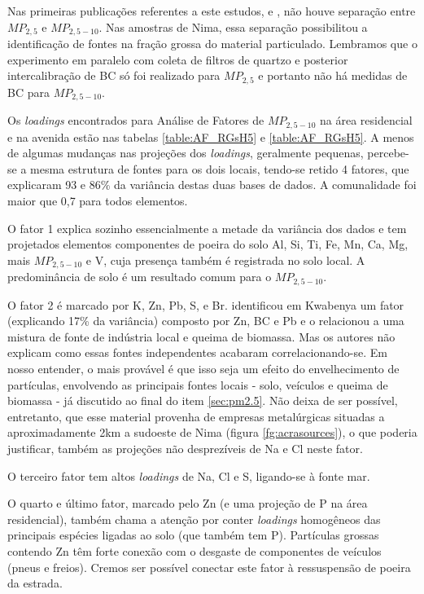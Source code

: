Nas primeiras publicações referentes a este estudos, \citet{ARKU2008} e 
\citet{DIONISIO2010}, não houve separação entre $MP_{2,5}$ e $MP_{2,5-10}$. 
Nas amostras de Nima, essa separação possibilitou a identificação
de fontes na fração grossa do material particulado. Lembramos que o experimento
em paralelo com coleta de filtros de quartzo e posterior intercalibração de BC
só foi realizado para $MP_{2,5}$ e portanto não há medidas de BC para 
$MP_{2,5-10}$.

Os \textit{loadings} encontrados para Análise de Fatores de $MP_{2,5-10}$
na área residencial e na avenida estão nas tabelas \ref{table:AF_RGsH5} e 
\ref{table:AF_RGsH5}. A menos de algumas mudanças nas projeções dos 
\textit{loadings}, geralmente pequenas, percebe-se a mesma estrutura de fontes 
para os dois locais, tendo-se retido 4 fatores, que explicaram 93 e 86\% da 
variância destas duas bases de dados. A comunalidade foi maior que 0,7 para 
todos elementos.

O fator 1 explica sozinho essencialmente a metade da variância dos dados e tem 
projetados elementos componentes de poeira do solo Al, Si, Ti, Fe, Mn, Ca, 
Mg, mais $MP_{2,5-10}$ e V, cuja presença também é registrada no solo local. 
A predominância de solo é um resultado comum para o $MP_{2,5-10}$.

O fator 2 é marcado por K, Zn, Pb, S, e Br. 
\citet{aboh2009} identificou em Kwabenya um fator (explicando 17\% da 
variância) composto por Zn, BC e Pb e o relacionou a uma mistura de 
fonte de indústria local e queima de biomassa. Mas os autores não explicam como 
essas fontes independentes acabaram correlacionando-se. Em nosso entender, o 
mais provável é que isso seja um efeito do envelhecimento de partículas, 
envolvendo as principais fontes locais - solo, veículos e queima de biomassa - 
já discutido ao final do item  \ref{sec:pm2.5}. Não deixa de ser possível, 
entretanto, que esse material provenha de empresas metalúrgicas situadas a
aproximadamente 2km a sudoeste de Nima (figura \ref{fg:acrasources}), 
o que poderia justificar, também as projeções não desprezíveis de Na e Cl 
neste fator.

O terceiro fator tem altos \textit{loadings} de Na, Cl e S, 
ligando-se à fonte mar. 

O quarto e último fator, marcado pelo Zn (e uma projeção de P na área 
residencial), também chama a atenção por conter \textit{loadings} homogêneos 
das principais espécies ligadas ao solo (que também tem P). Partículas grossas 
contendo Zn têm forte conexão com o desgaste de componentes de veículos 
(pneus e freios). Cremos ser possível conectar este fator à ressuspensão de 
poeira da estrada. 

